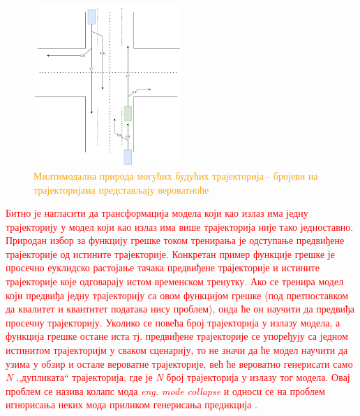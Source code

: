 \documentclass[11pt,oneside]{memoir}
\begin{document}
\begin{figure}[H]
  \centering
  \includegraphics[width=0.5\textwidth]{images/multimodal.drawio.png}
  \caption{\textcolor{orange}{Милтимодална природа могућих будућих трајекторија - бројеви на трајекторијама представљају вероватноће}}
  \label{multimodal-example}
\end{figure}

\textcolor{red}{Битно је нагласити да трансформација модела који као излаз има једну трајекторију у модел који као излаз има више трајекторија није тако једноставно.
Природан избор за функцију грешке током тренирања је одступање предвиђене трајекторије од истините трајекторије. Конкретан пример
функције грешке је просечно еуклидско растојање тачака предвиђене трајекторије и истините трајекторије које одговарају истом временском тренутку. Ако
се тренира модел који предвиђа једну трајекторију са овом функцијом грешке (под претпоставком да квалитет и квантитет података нису проблем), 
онда ће он научити да предвиђа просечну трајекторију. Уколико се повећа број трајекторија у излазу модела, а функција грешке остане иста тј. предвиђене
трајекторије се упоређују са једном истинитом трајекторијм у сваком сценарију, то не значи да ће модел научити да узима у обзир и остале
вероватне трајекторије, већ ће вероватно генерисати само \textit{N} ,,дупликата`` трајекторија, где је \textit{N} број трајекторија у излазу 
тог модела. Овај проблем се назива колапс мода \textit{eng. mode collapse} и односи се на проблем игнорисања неких мода приликом генерисања предикција 
\cite{overcoming_mode_collapse}.}
\end{document}
